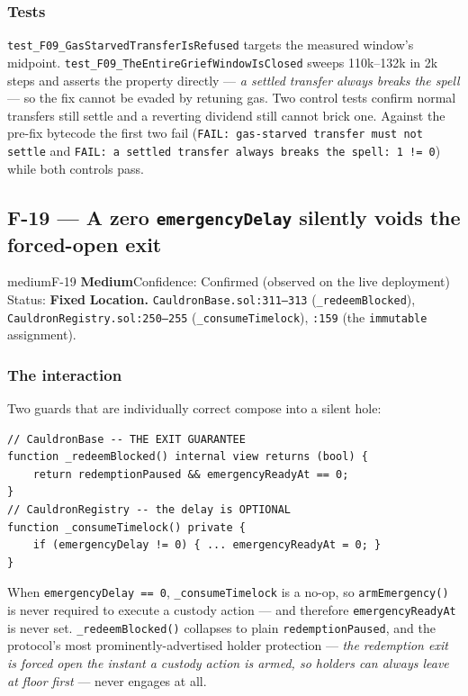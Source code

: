 \documentclass[11pt,a4paper]{article}
\newcommand{\code}[1]{\texttt{\small #1}}
\newcommand{\fileref}[1]{\texttt{\scriptsize #1}}
\begin{document}
\subsubsection*{Tests}

\code{test\_F09\_Gas\-Starved\-Transfer\-Is\-Refused} targets the measured
window's midpoint. \code{test\_F09\_The\-Entire\-Grief\-Window\-Is\-Closed} sweeps
110k--132k in 2k steps and asserts the property directly --- \emph{a settled transfer always breaks
the spell} --- so the fix cannot be evaded by retuning gas. Two control tests
confirm normal transfers still settle and a reverting dividend still cannot brick
one. Against the pre-fix bytecode the first two fail
(\code{FAIL: gas-starved transfer must not settle} and
\code{FAIL: a settled transfer always breaks the spell: 1 != 0}) while both
controls pass.

\newpage
\subsection{F-19 --- A zero \texorpdfstring{\code{emergencyDelay}}{emergencyDelay} silently voids the forced-open exit}

\begin{findingbox}{medium}{F-19 \quad \textbf{Medium}\quad Confidence: Confirmed (observed on the live deployment) \quad Status: \textbf{Fixed}}
\textbf{Location.} \fileref{CauldronBase.sol:311--313} (\code{\_redeemBlocked}),
\fileref{CauldronRegistry.sol:250--255} (\code{\_consumeTimelock}),
\fileref{:159} (the \code{immutable} assignment).
\end{findingbox}

\subsubsection*{The interaction}

Two guards that are individually correct compose into a silent hole:

\begin{lstlisting}
// CauldronBase -- THE EXIT GUARANTEE
function _redeemBlocked() internal view returns (bool) {
    return redemptionPaused && emergencyReadyAt == 0;
}
// CauldronRegistry -- the delay is OPTIONAL
function _consumeTimelock() private {
    if (emergencyDelay != 0) { ... emergencyReadyAt = 0; }
}
\end{lstlisting}

When \code{emergencyDelay == 0}, \code{\_consumeTimelock} is a no-op, so
\code{armEmergency()} is never required to execute a custody action --- and
therefore \code{emergencyReadyAt} is never set. \code{\_redeemBlocked()} collapses
to plain \code{redemptionPaused}, and the protocol's most prominently-advertised
holder protection --- \emph{the redemption exit is forced open the instant a
custody action is armed, so holders can always leave at floor first} --- never
engages at all.
\end{document}
